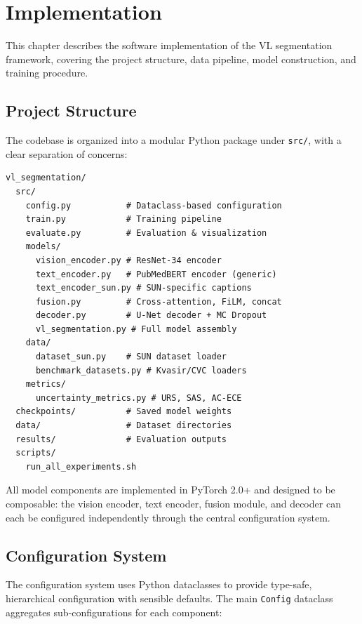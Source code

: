 
\chapter{Implementation}
\label{ch:implementation}

This chapter describes the software implementation of the \ac{VL} segmentation framework, covering the project structure, data pipeline, model construction, and training procedure.

\section{Project Structure}
\label{sec:impl:structure}

The codebase is organized into a modular Python package under \texttt{src/}, with a clear separation of concerns:

\begin{lstlisting}[language={}, caption={Project directory structure.}, label={lst:project_structure}]
vl_segmentation/
  src/
    config.py           # Dataclass-based configuration
    train.py            # Training pipeline
    evaluate.py         # Evaluation & visualization
    models/
      vision_encoder.py # ResNet-34 encoder
      text_encoder.py   # PubMedBERT encoder (generic)
      text_encoder_sun.py # SUN-specific captions
      fusion.py         # Cross-attention, FiLM, concat
      decoder.py        # U-Net decoder + MC Dropout
      vl_segmentation.py # Full model assembly
    data/
      dataset_sun.py    # SUN dataset loader
      benchmark_datasets.py # Kvasir/CVC loaders
    metrics/
      uncertainty_metrics.py # URS, SAS, AC-ECE
  checkpoints/          # Saved model weights
  data/                 # Dataset directories
  results/              # Evaluation outputs
  scripts/
    run_all_experiments.sh
\end{lstlisting}

All model components are implemented in PyTorch 2.0+ and designed to be composable: the vision encoder, text encoder, fusion module, and decoder can each be configured independently through the central configuration system.


\section{Configuration System}
\label{sec:impl:config}

The configuration system uses Python dataclasses to provide type-safe, hierarchical configuration with sensible defaults. The main \texttt{Config} dataclass aggregates sub-configurations for each component:

